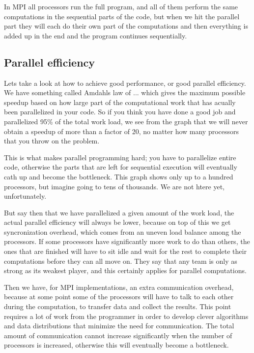 \documentclass [a4paper]{report}
\begin{document}
In MPI all processors run the full program, and all of them perform the same computations
in the sequential parts of the code, but when we hit the parallel part they will each do
their own part of the computations and then everything is added up in the end and the program
continues sequentially.

\subsection*{Parallel efficiency}
Lets take a look at how to achieve good performance, or good parallel efficiency. We have
something called Amdahls law of ... which gives the maximum possible speedup based on
how large part of the computational work that has acually been parallelized in your code.
So if you think you have done a good job and parallelized 95\% of the total work load, we 
see from the graph that we will never obtain a speedup of more than a factor of 20, no matter 
how many processors that you throw on the problem.

This is what makes parallel programming hard; you have to parallelize entire code, otherwise
the parts that are left for sequential execution will eventually cath up and become the 
bottleneck. This graph shows only up to a hundred processors, but imagine going to tens of 
thousands. We are not htere yet, unfortunately.

But say then that we have parallelized a given amount of the work load, the actual parallel
efficiency will always be lower, because on top of this we get syncronization overhead,
which comes from an uneven load balance among the processors. If some processors have 
significantly more work to do than others, the ones that are finished will have to sit
idle and wait for the rest to complete their computations before they can all move on.
They say that any team is only as strong as its weakest player, and this certainly applies 
for parallel computations.

Then we have, for MPI implementations, an extra communication overhead, because at some point
some of the processors will have to talk to each other during the computation, to transfer
data and collect the results. This point requires a lot of work from the programmer in order
to develop clever algorithms and data distributions that minimize the need for communication. 
The total amount of communication cannot increase significantly when the number of processors
is increased, otherwise this will eventually become a bottleneck.
\end{document}
